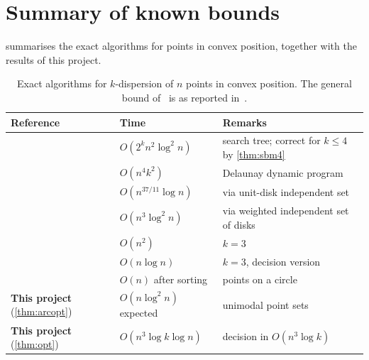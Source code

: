 \section{Summary of known bounds}

 summarises the exact algorithms for points in convex position,
together with the results of this project.

\begin{table}[htb]
\centering
\caption{Exact algorithms for $k$-dispersion of $n$ points in convex position.
The general bound of~\citet{tw25} is as reported in~\citet{tw26}.}
\label{tab:known}
\small\setlength{\tabcolsep}{4pt}
\begin{tabular}{@{}lll@{}}
\toprule
Reference & Time & Remarks\\
\midrule
\citet{sbm} & $O(2^k n^2\log^2 n)$ & search tree; correct for $k\le4$ by \cref{thm:sbm4}\\
\citet{sbm} & $O(n^4k^2)$ & Delaunay dynamic program\\
\citet{tw25} & $O(n^{37/11}\log n)$ & via unit-disk independent set\\
\citet{tw26} & $O(n^3\log^2 n)$ & via weighted independent set of disks\\
\citet{kobayashi} & $O(n^2)$ & $k=3$\\
\citet{tw25} & $O(n\log n)$ & $k=3$, decision version\\
\citet{akagi} & $O(n)$ after sorting & points on a circle\\
\midrule
\textbf{This project} (\cref{thm:arcopt}) & $O(n\log^2n)$ expected & unimodal point sets\\
\textbf{This project} (\cref{thm:opt}) & $O(n^3\log k\log n)$ & decision in $O(n^3\log k)$\\
\bottomrule
\end{tabular}
\end{table}

